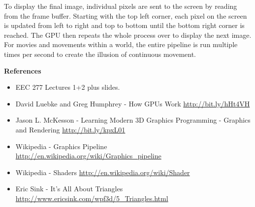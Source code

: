 \documentclass[12pt] {article}
\begin{document}
To display the final image, individual pixels are sent to the screen by reading from the frame buffer. Starting with the top left corner, each pixel on the screen is updated from left to right and top to bottom until the bottom right corner is reached. The GPU then repeats the whole process over to display the next image. For movies and movements within a world, the entire pipeline is run multiple times per second to create the illusion of continuous movement.


\clearpage
\large \bf {References}
\medskip

\normalsize
\begin{itemize}
	
	\item EEC 277 Lectures 1+2 plus slides.
	
	\item David Luebke and Greg Humphrey - How GPUs Work \newline
	\url {http://bit.ly/hHt4VH}
		
	\item Jason L. McKesson - Learning Modern 3D Graphics Programming - Graphics and Rendering \newline
	\url {http://bit.ly/kpxL01}
		
	\item Wikipedia - Graphics Pipeline \newline
	\url {http://en.wikipedia.org/wiki/Graphics_pipeline}
	
	\item Wikipedia - Shaders \newline
	\url {http://en.wikipedia.org/wiki/Shader}
	
	\item Eric Sink - It's All About Triangles \newline
	\url {http://www.ericsink.com/wpf3d/5_Triangles.html}	
\end{itemize}
\end{document}
